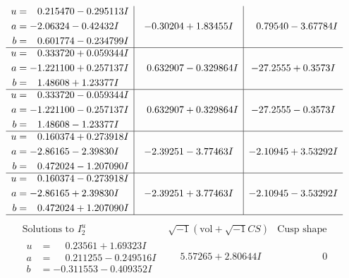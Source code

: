 \documentclass[1p]{elsarticle_modified}
\theoremstyle{definition}
\newcommand{\I}{\sqrt{-1}}
\begin{document}
$$\begin{array}{c|c|c}
\begin{aligned}
u &= \phantom{-}0.215470 - 0.295113 I \\
a &= -2.06324 - 0.42432 I \\
b &= \phantom{-}0.601774 - 0.234799 I\end{aligned}
 & -0.30204 + 1.83455 I & \phantom{-}0.79540 - 3.67784 I \\ \hline\begin{aligned}
u &= \phantom{-}0.333720 + 0.059344 I \\
a &= -1.221100 + 0.257137 I \\
b &= \phantom{-}1.48608 + 1.23377 I\end{aligned}
 & \phantom{-}0.632907 - 0.329864 I & -27.2555 + 0.3573 I \\ \hline\begin{aligned}
u &= \phantom{-}0.333720 - 0.059344 I \\
a &= -1.221100 - 0.257137 I \\
b &= \phantom{-}1.48608 - 1.23377 I\end{aligned}
 & \phantom{-}0.632907 + 0.329864 I & -27.2555 - 0.3573 I \\ \hline\begin{aligned}
u &= \phantom{-}0.160374 + 0.273918 I \\
a &= -2.86165 - 2.39830 I \\
b &= \phantom{-}0.472024 - 1.207090 I\end{aligned}
 & -2.39251 - 3.77463 I & -2.10945 + 3.53292 I \\ \hline\begin{aligned}
u &= \phantom{-}0.160374 - 0.273918 I \\
a &= -2.86165 + 2.39830 I \\
b &= \phantom{-}0.472024 + 1.207090 I\end{aligned}
 & -2.39251 + 3.77463 I & -2.10945 - 3.53292 I\\
 \hline 
 \end{array}$$\newpage$$\begin{array}{c|c|c}  
\text{Solutions to }I^u_{2}& \I (\text{vol} + \sqrt{-1}CS) & \text{Cusp shape}\\
 \hline 
\begin{aligned}
u &= \phantom{-}0.23561 + 1.69323 I \\
a &= \phantom{-}0.211255 - 0.249516 I \\
b &= -0.311553 - 0.409352 I\end{aligned}
 & \phantom{-}5.57265 + 2.80644 I & \phantom{-0.000000 } 0 \\ \hline\begin{aligned}

\end{aligned}
\end{array}$$
\end{document}
